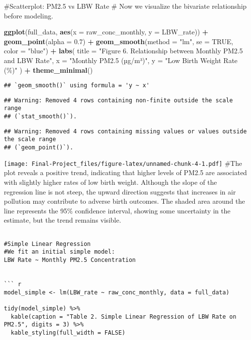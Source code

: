 \documentclass[
]{article}
\newenvironment{Shaded}{\begin{snugshade}}{\end{snugshade}}
\newcommand{\AttributeTok}[1]{\textcolor[rgb]{0.13,0.29,0.53}{#1}}
\newcommand{\ConstantTok}[1]{\textcolor[rgb]{0.56,0.35,0.01}{#1}}
\newcommand{\FloatTok}[1]{\textcolor[rgb]{0.00,0.00,0.81}{#1}}
\newcommand{\FunctionTok}[1]{\textcolor[rgb]{0.13,0.29,0.53}{\textbf{#1}}}
\newcommand{\NormalTok}[1]{#1}
\newcommand{\SpecialCharTok}[1]{\textcolor[rgb]{0.81,0.36,0.00}{\textbf{#1}}}
\newcommand{\StringTok}[1]{\textcolor[rgb]{0.31,0.60,0.02}{#1}}
\begin{document}
\#Scatterplot: PM2.5 vs LBW Rate \# Now we visualize the bivariate
relationship before modeling.

\begin{Shaded}
\begin{Highlighting}[]
\FunctionTok{ggplot}\NormalTok{(full\_data, }\FunctionTok{aes}\NormalTok{(}\AttributeTok{x =}\NormalTok{ raw\_conc\_monthly, }\AttributeTok{y =}\NormalTok{ LBW\_rate)) }\SpecialCharTok{+}
  \FunctionTok{geom\_point}\NormalTok{(}\AttributeTok{alpha =} \FloatTok{0.7}\NormalTok{) }\SpecialCharTok{+}
  \FunctionTok{geom\_smooth}\NormalTok{(}\AttributeTok{method =} \StringTok{"lm"}\NormalTok{, }\AttributeTok{se =} \ConstantTok{TRUE}\NormalTok{, }\AttributeTok{color =} \StringTok{"blue"}\NormalTok{) }\SpecialCharTok{+}
  \FunctionTok{labs}\NormalTok{(}
    \AttributeTok{title =} \StringTok{"Figure 6. Relationship between Monthly PM2.5 and LBW Rate"}\NormalTok{,}
    \AttributeTok{x =} \StringTok{"Monthly PM2.5 (µg/m³)"}\NormalTok{,}
    \AttributeTok{y =} \StringTok{"Low Birth Weight Rate (\%)"}
\NormalTok{  ) }\SpecialCharTok{+}
  \FunctionTok{theme\_minimal}\NormalTok{()}
\end{Highlighting}
\end{Shaded}

\begin{verbatim}
## `geom_smooth()` using formula = 'y ~ x'
\end{verbatim}

\begin{verbatim}
## Warning: Removed 4 rows containing non-finite outside the scale range
## (`stat_smooth()`).
\end{verbatim}

\begin{verbatim}
## Warning: Removed 4 rows containing missing values or values outside the scale range
## (`geom_point()`).
\end{verbatim}

\texttt{[image: Final-Project\_files/figure-latex/unnamed-chunk-4-1.pdf]}
\#The plot reveals a positive trend, indicating that higher levels of
PM2.5 are associated with slightly higher rates of low birth weight.
Although the slope of the regression line is not steep, the upward
direction suggests that increases in air pollution may contribute to
adverse birth outcomes. The shaded area around the line represents the
95\% confidence interval, showing some uncertainty in the estimate, but
the trend remains visible.

\begin{verbatim}

#Simple Linear Regression
#We fit an initial simple model:
LBW Rate ~ Monthly PM2.5 Concentration


``` r
model_simple <- lm(LBW_rate ~ raw_conc_monthly, data = full_data)

tidy(model_simple) %>%
  kable(caption = "Table 2. Simple Linear Regression of LBW Rate on PM2.5", digits = 3) %>%
  kable_styling(full_width = FALSE)
\end{verbatim}
\end{document}
